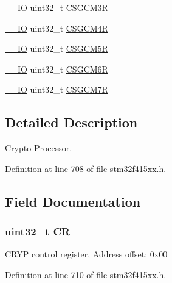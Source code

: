 \begin{DoxyCompactItemize}
\hyperlink{core__sc300_8h_aec43007d9998a0a0e01faede4133d6be}{\+\_\+\+\_\+\+IO} uint32\+\_\+t \hyperlink{struct_c_r_y_p___type_def_a13e161a9d71fc723979c06fe4e6e5bf5}{C\+S\+G\+C\+M3R}
\item 
\hyperlink{core__sc300_8h_aec43007d9998a0a0e01faede4133d6be}{\+\_\+\+\_\+\+IO} uint32\+\_\+t \hyperlink{struct_c_r_y_p___type_def_a63fc99181cf78d1f43270e79bcf787b5}{C\+S\+G\+C\+M4R}
\item 
\hyperlink{core__sc300_8h_aec43007d9998a0a0e01faede4133d6be}{\+\_\+\+\_\+\+IO} uint32\+\_\+t \hyperlink{struct_c_r_y_p___type_def_a470c323c7caa5d4362656cb0c8aa4528}{C\+S\+G\+C\+M5R}
\item 
\hyperlink{core__sc300_8h_aec43007d9998a0a0e01faede4133d6be}{\+\_\+\+\_\+\+IO} uint32\+\_\+t \hyperlink{struct_c_r_y_p___type_def_a8c2f4a1d321b61dc3b7833d209eb0ede}{C\+S\+G\+C\+M6R}
\item 
\hyperlink{core__sc300_8h_aec43007d9998a0a0e01faede4133d6be}{\+\_\+\+\_\+\+IO} uint32\+\_\+t \hyperlink{struct_c_r_y_p___type_def_a64151eda4e4e3370f4e264a2d9f61776}{C\+S\+G\+C\+M7R}
\end{DoxyCompactItemize}


\subsection{Detailed Description}
Crypto Processor. 

Definition at line 708 of file stm32f415xx.\+h.



\subsection{Field Documentation}
\subsubsection[{\texorpdfstring{CR}{CR}}]{ uint32\+\_\+t CR}\hypertarget{struct_c_r_y_p___type_def_ab40c89c59391aaa9d9a8ec011dd0907a}{}\label{struct_c_r_y_p___type_def_ab40c89c59391aaa9d9a8ec011dd0907a}
C\+R\+YP control register, Address offset\+: 0x00 

Definition at line 710 of file stm32f415xx.\+h.


